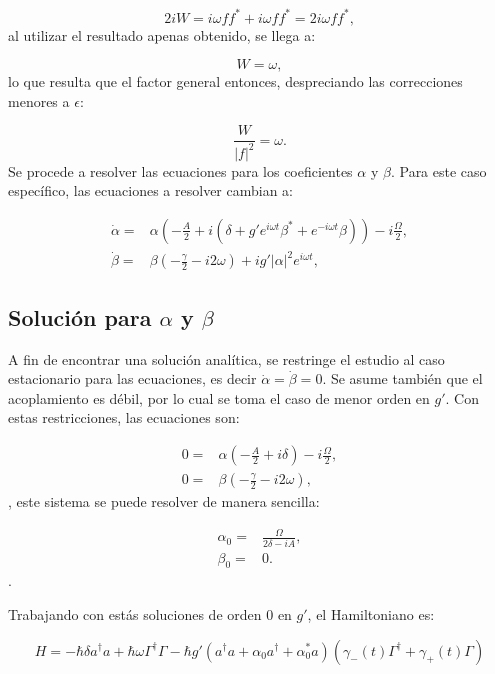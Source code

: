 \documentclass[a4paper,10pt]{report}
\begin{document}
\begin{equation}
2iW = i\omega ff^* + i\omega ff^* = 2i\omega ff^*,
\end{equation} al utilizar el resultado apenas obtenido, se llega a:

\begin{equation}
W = \omega,
\end{equation} lo que resulta que el factor general entonces, despreciando las correcciones menores a $\epsilon$:

\begin{equation}
\frac{W}{|f|^2} = \omega.
\end{equation} Se procede a resolver las ecuaciones para los coeficientes $\alpha$ y $\beta$. Para este caso específico, las ecuaciones a resolver cambian a:

\begin{align}
\dot{\alpha} =& \alpha(-\frac{A}{2}+i(\delta+g'e^{i\omega t} \beta^* + e^{-i\omega t} \beta))-i\frac{\Omega}{2},\\
\dot{\beta} =& \beta(-\frac{\gamma}{2}-i 2\omega)+ig'|\alpha|^2e^{i\omega t},
\end{align}

\subsection{Solución para $\alpha$ y $\beta$}

A fin de encontrar una solución analítica, se restringe el estudio al caso estacionario para las ecuaciones, es decir $\dot{\alpha}= \dot{\beta} = 0$. Se asume también que el acoplamiento es débil, por lo cual se toma el caso de menor orden en $g'$. Con estas restricciones, las ecuaciones son:

\begin{align}
0 =& \alpha(-\frac{A}{2}+i\delta)-i\frac{\Omega}{2},\\
0 =& \beta(-\frac{\gamma}{2}-i 2\omega),
\end{align}, este sistema se puede resolver de manera sencilla:

\begin{align}
\alpha_0 =& \frac{\Omega}{2\delta-iA},\\
\beta_0 =& 0.
\end{align}. 

Trabajando con estás soluciones de orden $0$ en $g'$, el Hamiltoniano es:

\begin{equation}
H = -\hbar \delta a^{\dagger}a +\hbar\omega\Gamma^{\dagger}\Gamma -\hbar g'(a^{\dagger}a +\alpha_0 a^{\dagger}+\alpha^*_0 a)(\gamma_-(t)\Gamma^{\dagger}+\gamma_+(t)\Gamma)
\end{equation}
\end{document}
